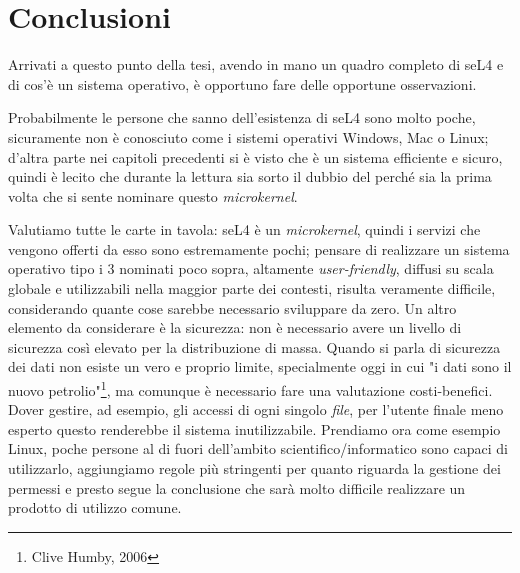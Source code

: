 \chapter{Conclusioni}
Arrivati a questo punto della tesi, avendo in mano un quadro completo di seL4 e di cos'è un sistema operativo, è opportuno fare delle opportune osservazioni.

Probabilmente le persone che sanno dell'esistenza di seL4 sono molto poche, sicuramente non è conosciuto come i sistemi operativi Windows, Mac o Linux; d'altra parte nei capitoli precedenti si è visto che è un sistema efficiente e sicuro, quindi è lecito che durante la lettura sia sorto il dubbio del perché sia la prima volta che si sente nominare questo \textit{microkernel}.

Valutiamo tutte le carte in tavola: seL4 è un \textit{microkernel}, quindi i servizi che vengono offerti da esso sono estremamente pochi; pensare di realizzare un sistema operativo tipo i 3 nominati poco sopra, altamente \textit{user-friendly}, diffusi su scala globale e utilizzabili nella maggior parte dei contesti, risulta veramente difficile, considerando quante cose sarebbe necessario sviluppare da zero. Un altro elemento da considerare è la sicurezza: non è necessario avere un livello di sicurezza così elevato per la distribuzione di massa. Quando si parla di sicurezza dei dati non esiste un vero e proprio limite, specialmente oggi in cui "i dati sono il nuovo petrolio"\footnote{Clive Humby, 2006}, ma comunque è necessario fare una valutazione costi-benefici. Dover gestire, ad esempio, gli accessi di ogni singolo \textit{file}, per l'utente finale meno esperto questo renderebbe il sistema inutilizzabile. Prendiamo ora come esempio Linux, poche persone al di fuori dell'ambito scientifico/informatico sono capaci di utilizzarlo, aggiungiamo regole più stringenti per quanto riguarda la gestione dei permessi e presto segue la conclusione che sarà molto difficile realizzare un prodotto di utilizzo comune.

